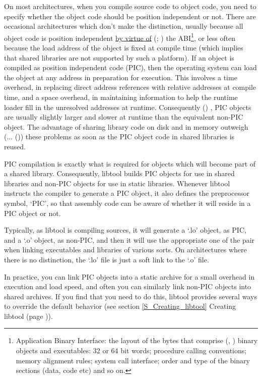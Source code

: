 On most architectures, when you compile source code to object code, you need 
to specify whether the object code should be position independent or not.
There are occasional architectures which don't make the distinction, usually 
because all object code is position independent \underline{by virtue of} ({\MbQ{}};
{\MfQ{}}) the ABI\footnote{Application Binary Interface: the layout of the bytes 
that comprise ({\MdQ{}}, {\MdQ{}}) binary objects and executables: 32 or 64 bit words;
procedure calling conventions; memory alignment rules; system call interface;
order and type of the binary sections (data, code etc) and so on.}, or less 
often because the load address of the object is fixed at compile time (which 
implies that shared libraries are not supported by such a platform). If an 
object is compiled as position independent code (PIC), then the operating 
system can load the object at any address in preparation for execution. This 
involves a time overhead, in replacing direct address references with relative 
addresses at compile time, and a space overhead, in maintaining information to 
help the runtime loader fill in the unresolved addresses at runtime.
Consequently ({\McQ{}}) , PIC objects are usually slightly larger and slower at 
runtime than the equivalent non-PIC object. The advantage of sharing library 
code on disk and in memory outweigh ({\MbQ{}}... {\MbQ{}} ({\MbQ{}})) these 
problems as soon as the PIC object code in shared libraries is reused. 

PIC compilation is exactly what is required for objects which will become part of a shared library. Consequently, libtool builds PIC objects for use in shared libraries and non-PIC objects for use in static libraries. Whenever libtool instructs the compiler to generate a PIC object, it also defines the preprocessor symbol, `PIC', so that assembly code can be aware of whether it will reside in a PIC object or not. 


Typically, as libtool is compiling sources, it will generate a `.lo' object, as PIC, and a `.o' object, as non-PIC, and then it will use the appropriate one of the pair when linking executables and libraries of various sorts. On architectures where there is no distinction, the `.lo' file is just a soft link to the `.o' file. 


In practice, you can link PIC objects into a static archive for a small 
overhead in execution and load speed, and often you can similarly link non-PIC 
objects into shared archives. If you find that you need to do this, libtool 
provides several ways to override the default behavior
(see section \ref{S_Creating_libtool} Creating libtool
(page \pageref{S_Creating_libtool})). 

